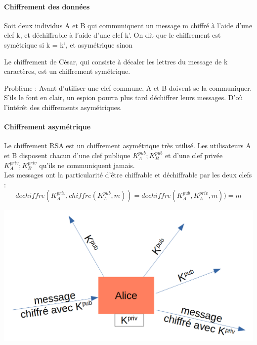 \paragraph{Chiffrement des données}
\begin{definition}
	Soit deux individus A et B qui communiquent un message m chiffré à l'aide d'une clef k, et déchiffrable à l'aide d'une clef k'. On dit que le chiffrement est symétrique si k = k', et asymétrique sinon
\end{definition}

\begin{example}
	Le chiffrement de César, qui consiste à décaler les lettres du message de k caractères, est un chiffrement symétrique.
\end{example}

\begin{com}
Problème : Avant d'utiliser une clef commune, A et B doivent se la communiquer. S'ils le font en clair, un espion pourra plus tard déchiffrer leurs messages. D'où l'intérêt des chiffrements asymétriques.
\end{com}

\paragraph{Chiffrement asymétrique\\}
	Le chiffrement RSA est un chiffrement asymétrique très utilisé. Les utilisateurs A et B disposent chacun d'une clef publique $K_{A}^{pub} ; K_{B}^{pub}$ et d'une clef privée  $K_{A}^{priv} ; K_{B}^{priv}$ qu'ils ne communiquent jamais. \\
	Les messages ont la particularité d'être chiffrable et déchiffrable par les deux clefs : \\
	$$dechiffre(K_{A}^{priv}, chiffre(K_{A}^{pub}, m)) = dechiffre(K_{A}^{pub}, K_{A}^{priv},m)) = m$$
	\begin{center}
		\includegraphics[scale = 0.38]{Developpements/Protocole HTTPS/cle_publique.png}
	\end{center}

